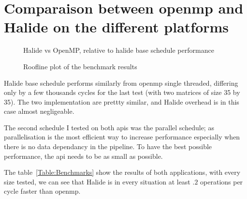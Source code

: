 \section{Comparaison between \acrshort{openmp} and Halide on the different platforms}

\begin{figure}
	    \captionsetup{skip=1cm}
        
    \caption{Halide vs OpenMP, relative to halide base schedule performance}
	\label{fig:barPlot}
\end{figure}




\begin{figure}[H]
	
    \caption{Roofline plot of the benchmark results}
	\label{fig:roofline}
\end{figure}


	Halide base schedule performs similarly from \gls{openmp} single threaded, differing only by a few thousands cycles for the last test (with two matrices of size 35 by 35).
	The two implementation are prettty similar, and Halide overhead is in this case almost negligeable.

	The second schedule I tested on both \glspl{api} was the parallel schedule; as parallelisation is the most efficient way to increase performance especially when there is no data dependancy in the pipeline. To have the best possible performance, the \gls{api} needs to be as small as possible.

	The table~\ref{Table:Benchmarks} show the results of both applications, with every size tested, we can see that Halide is in every situation at least $.2$ operations per cycle faster than \gls{openmp}.




